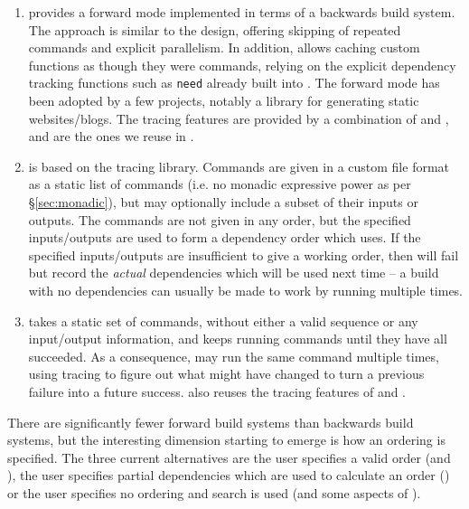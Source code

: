 \begin{enumerate}
\item \Shake \cite{shake} provides a forward mode implemented in terms of a backwards build system. The approach is similar to the \Fabricate design, offering skipping of repeated commands and explicit parallelism. In addition, \Shake allows caching custom functions as though they were commands, relying on the explicit dependency tracking functions such as \texttt{need} already built into \Shake. The forward mode has been adopted by a few projects, notably a library for generating static websites/blogs. The tracing features are provided by a combination of \Shake and \Fsatrace, and are the ones we reuse in \Rattle.
\item \Fac \cite{fac} is based on the \Bigbro tracing library. Commands are given in a custom file format as a static list of commands (i.e. no monadic expressive power as per \S\ref{sec:monadic}), but may optionally include a subset of their inputs or outputs. The commands are not given in any order, but the specified inputs/outputs are used to form a dependency order which \Fac uses. If the specified inputs/outputs are insufficient to give a working order, then \Fac will fail but record the \emph{actual} dependencies which will be used next time -- a build with no dependencies can usually be made to work by running \Fac multiple times.
\item \Stroll \cite{stroll} takes a static set of commands, without either a valid sequence or any input/output information, and keeps running commands until they have all succeeded. As a consequence, \Stroll may run the same command multiple times, using tracing to figure out what might have changed to turn a previous failure into a future success. \Stroll also reuses the tracing features of \Shake and \Fsatrace.
\end{enumerate}

There are significantly fewer forward build systems than backwards build systems, but the interesting dimension starting to emerge is how an ordering is specified. The three current alternatives are the user specifies a valid order (\Fabricate and \Rattle), the user specifies partial dependencies which are used to calculate an order (\Fac) or the user specifies no ordering and search is used (\Stroll and some aspects of \Fac).

